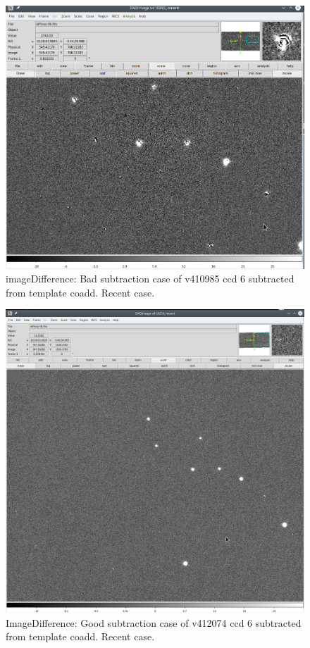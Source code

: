 \documentclass{article}
\begin{document}
\begin{figure}
  \includegraphics[width=\textwidth]{Scr_v410985_recent.png}
\caption{\label{fig:v410985new}imageDifference: Bad subtraction case of v410985 ccd 6 subtracted from
  template coadd. Recent case.}  
\end{figure}
%
\begin{figure}
  \includegraphics[width=\textwidth]{Scr_v412074_recent.png}
\caption{ImageDifference: Good subtraction case of v412074 ccd 6 subtracted from
  template coadd. Recent case.}  
\end{figure}
\end{document}
